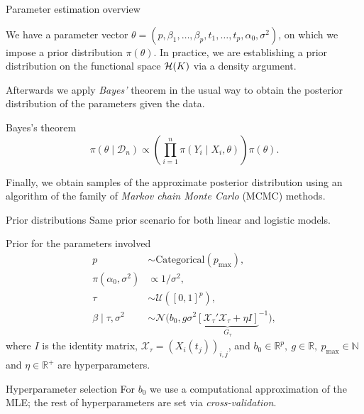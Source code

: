 \documentclass[10pt, english, professionalfonts]{beamer}
\newcommand{\N}{\mathbb{N}}
\newcommand{\R}{\mathbb{R}}
\newcommand{\Hcal}{\ensuremath\mathcal{H}}
\begin{document}
\begin{frame}{Parameter estimation overview}

  We have a parameter vector \(\theta = (p, \beta_1,\dots, \beta_p, t_1,\dots, t_p, \alpha_0, \sigma^2)\), on which we impose a prior distribution \(\pi(\theta)\). In practice, we are establishing a prior distribution on the functional space \(\Hcal(K)\) via a density argument.

  \vspace{1em}

  Afterwards we apply \textit{Bayes'}  theorem in the usual way to obtain the posterior distribution of the parameters given the data.

  \begin{block}{Bayes's theorem}
      \[
      \pi(\theta \mid \mathcal D_n) \propto \left( \prod_{i=1}^n \pi(Y_i\mid X_i, \theta) \right)\pi(\theta).
      \]
  \end{block}
  \vspace{1em}

  Finally, we obtain samples of the approximate posterior distribution using an algorithm of the family of \textit{Markov chain Monte Carlo} (MCMC) methods.

\end{frame}

\begin{frame}{Prior distributions}
  Same prior scenario for both linear and logistic models.
  \begin{block}{Prior for the parameters involved}
    \vspace{-1em}
  \begin{align*}
    p &\sim \text{Categorical}(p_{\text{max}}),\\
  \pi(\alpha_0, \sigma^2)              & \propto 1/\sigma^2,                                                     \\
  \tau                     & \sim \mathcal U([0, 1]^p),                                              \\
  \beta\mid \tau, \sigma^2 & \sim \mathcal N\big(b_0, g\sigma^2{\underbrace{\left[\mathcal X_\tau' \mathcal X_\tau + \eta I\right]}_{G_\tau}}^{-1}\big),
\end{align*}
where \(I\) is the identity matrix, \(\mathcal X_\tau = (X_i(t_j))_{i,j}\), and \(b_0\in \R^p, \ g \in \R, \ p_{\text{max}}\in \N\) and \(\eta \in \R^+\) are hyperparameters.
\end{block}


\begin{alertblock}{Hyperparameter selection}
  \vspace{0.1em}
  For \(b_0\) we use a computational approximation of the MLE; the rest of hyperparameters are set via \textit{cross-validation}.
\end{alertblock}
\end{frame}
\end{document}
